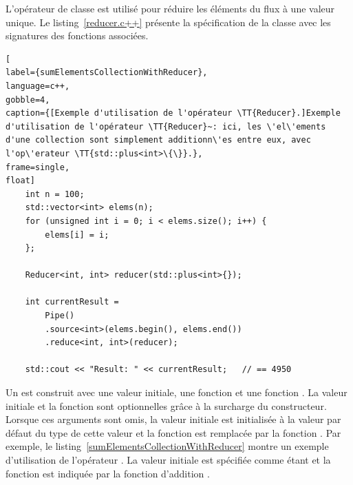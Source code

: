 
L'op\'erateur de classe  est utilis\'e pour r\'eduire les \'el\'ements du flux \`a une valeur unique. Le listing~\ref{reducer.c++} présente la spécification  de la classe  avec les signatures des fonctions associées. 


\begin{lstlisting}[
label={sumElementsCollectionWithReducer},
language=c++,
gobble=4,
caption={[Exemple d'utilisation de l'opérateur \TT{Reducer}.]Exemple
d'utilisation de l'opérateur \TT{Reducer}~: ici, les \'el\'ements
d'une collection sont simplement additionn\'es entre eux, avec
l'op\'erateur \TT{std::plus<int>\{\}}.},
frame=single,
float]
    int n = 100;
    std::vector<int> elems(n);
    for (unsigned int i = 0; i < elems.size(); i++) {
        elems[i] = i;
    };

    Reducer<int, int> reducer(std::plus<int>{});

    int currentResult =
        Pipe()
        .source<int>(elems.begin(), elems.end())
        .reduce<int, int>(reducer);

	std::cout << "Result: " << currentResult;	// == 4950   
\end{lstlisting}



Un  est construit avec une valeur initiale, une fonction  et une fonction . La valeur initiale et la fonction  sont optionnelles gr\^ace \`a la surcharge du constructeur. Lorsque ces arguments sont omis, la valeur initiale est initialis\'ee \`a la valeur par d\'efaut du type de cette valeur et la fonction  est remplac\'ee par la fonction . Par exemple, le listing~\ref{sumElementsCollectionWithReducer} montre un exemple d'utilisation de l'op\'erateur . La valeur initiale est sp\'ecifi\'ee comme \'etant  et la fonction  est indiqu\'ee par la fonction d'addition . 


